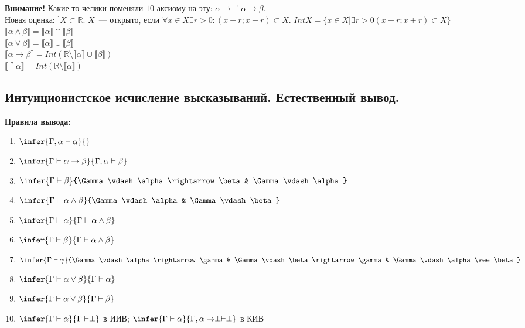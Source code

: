 \documentclass{article}
\begin{document}
	\textbf{Внимание!} Какие-то челики поменяли $10$ аксиому на эту: $\alpha \rightarrow \urcorner \alpha \rightarrow \beta$. \\
	Новая оценка: $] X \subset \mathbb{R}$. $X$~--- открыто, если $\forall x \in X \exists r > 0: (x - r; x + r) \subset X$. $Int X = \{ x \in X | \exists r > 0 (x - r; x + r) \subset X \}$ \\
	$\llbracket \alpha \wedge \beta \rrbracket = \llbracket \alpha \rrbracket \cap \llbracket \beta \rrbracket$ \\
	$\llbracket \alpha \vee \beta \rrbracket = \llbracket \alpha \rrbracket \cup \llbracket \beta \rrbracket$ \\
	$\llbracket \alpha \rightarrow \beta \rrbracket = Int(\mathbb{R} \setminus \llbracket \alpha \rrbracket \cup \llbracket \beta \rrbracket)$ \\
	$\llbracket \urcorner \alpha \rrbracket = Int(\mathbb{R} \setminus \llbracket \alpha \rrbracket)$
	\subsection{Интуиционистское исчисление высказываний. Естественный вывод.}
	\textbf{Правила вывода:}
	\begin{enumerate}
		\item $\infer{\Gamma, \alpha \vdash \alpha}{}$
		\item $\infer{\Gamma \vdash \alpha \rightarrow \beta}{\Gamma, \alpha \vdash \beta}$
		\item $\infer{\Gamma \vdash \beta}{\Gamma \vdash \alpha \rightarrow \beta & \Gamma \vdash \alpha}$
		\item $\infer{\Gamma \vdash \alpha \wedge \beta}{\Gamma \vdash \alpha & \Gamma \vdash \beta}$
		\item $\infer{\Gamma \vdash \alpha}{\Gamma \vdash \alpha \wedge \beta}$
		\item $\infer{\Gamma \vdash \beta}{\Gamma \vdash \alpha \wedge \beta}$
		\item $\infer{\Gamma \vdash \gamma}{\Gamma \vdash \alpha \rightarrow \gamma & \Gamma \vdash \beta \rightarrow \gamma & \Gamma \vdash \alpha \vee \beta}$
		\item $\infer{\Gamma \vdash \alpha \vee \beta}{\Gamma \vdash \alpha}$
		\item $\infer{\Gamma \vdash \alpha \vee \beta}{\Gamma \vdash \beta}$
		\item $\infer{\Gamma \vdash \alpha}{\Gamma \vdash \perp}$ в ИИВ; $\infer{\Gamma \vdash \alpha}{\Gamma, \alpha \rightarrow \perp \vdash \perp}$ в КИВ
	\end{enumerate}
\end{document}
